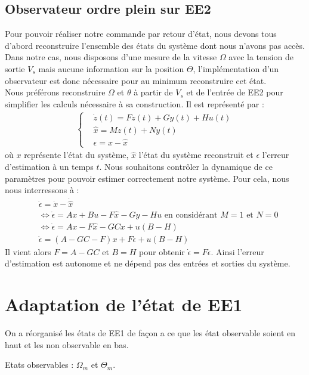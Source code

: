 \subsection{Observateur ordre plein sur EE2}
Pour pouvoir réaliser notre commande par retour d'état, nous devons tous d'abord reconstruire l'ensemble des états du système dont nous n'avons pas accès. Dans notre cas, nous disposons d'une mesure de la vitesse $\Omega$ avec la tension de sortie $V_s$ mais aucune information sur la position $\Theta$, l'implémentation d'un observateur est donc nécessaire pour au minimum reconstruire cet état.\\
Nous préférons reconstruire $\Omega$ et $\theta$ à partir de $V_s$ et de l'entrée de EE2 pour simplifier les calculs nécessaire à sa construction. Il est représenté par :
\begin{align*}
\left\lbrace
\begin{aligned}
&\dot z (t) = Fz(t) + Gy(t) + Hu(t)\\
&\hat x = Mz(t) + Ny(t)\\
&\epsilon = x-\hat{x}
\end{aligned}
\right.
\end{align*} où $x$ représente l'état du système, $\hat{x}$ l'état du système reconstruit et $\epsilon$ l'erreur d'estimation à un temps $t$. Nous souhaitons contrôler la dynamique de ce paramètres pour pouvoir estimer correctement notre système. Pour cela, nous nous interressons à : \begin{align*}
&\dot{\epsilon} = \dot{x} - \dot{\hat{x}}\\
&\Leftrightarrow \dot{\epsilon} = Ax +Bu - F\hat{x} - Gy - Hu 
\text{   en considérant }M=1 \text{ et } N = 0\\
& \Leftrightarrow \dot{\epsilon} = Ax - F\hat{x} - GCx + u(B-H)\\
& \dot{\epsilon} = (A-GC-F)x + F\epsilon + u(B-H)
\end{align*} 
Il vient alors $F = A-GC$ et $B=H$ pour obtenir $\dot{\epsilon} = F\epsilon$. Ainsi l'erreur d'estimation est autonome et ne dépend pas des entrées et sorties du système.
\section{Adaptation de l'état de EE1}
On a réorganisé les états de EE1 de façon a ce que les état observable soient en haut et les non observable en bas.

\noindent\textbullet\hspace{2mm} Etats observables : $\Omega_m$ et $ \Theta_m$.

